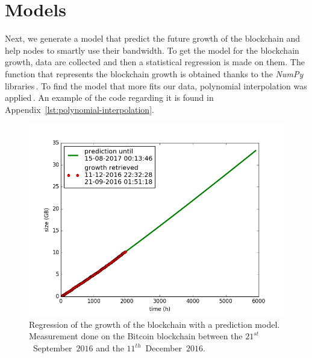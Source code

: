 \documentclass[USenglish]{uit-thesis}
\begin{document}
\section{Models}
\label{sec:models}

Next, we generate a model
that predict the future growth of the blockchain and help nodes to smartly use their bandwidth.
To get the model for the blockchain growth, data are collected and then a statistical
regression is made on them. The function that represents the blockchain growth is obtained
thanks to the \emph{NumPy} libraries\,\cite{scipy}. To find the model that more fits our data, polynomial
interpolation was applied\,\cite{Hildebrand:1987:INA}. An example of the code regarding it is found
in Appendix~\ref{lst:polynomial-interpolation}.

\begin{figure}[H]
	\centering
	\includegraphics[width=1\textwidth]{img/regression_growth_blockchain}
	\caption{Regression of the growth of the blockchain with a prediction model.
		Measurement done on the
		Bitcoin blockchain between the $21^{st}$~September~$2016$ and the
		$11^{th}$~December~$2016$.}
	\label{fig:regression_growth}
\end{figure}
\end{document}
